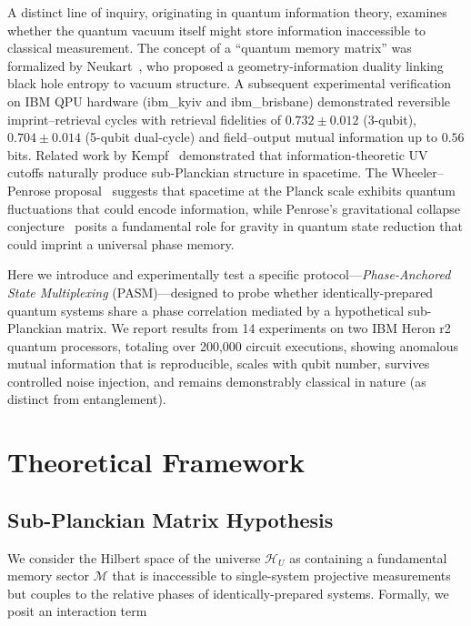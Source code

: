 ﻿\documentclass[12pt,a4paper]{article}
\begin{document}
A distinct line of inquiry, originating in quantum information theory, examines whether the quantum vacuum itself might store information inaccessible to classical measurement. The concept of a ``quantum memory matrix'' was formalized by Neukart~\cite{neukart2025}, who proposed a geometry-information duality linking black hole entropy to vacuum structure. A subsequent experimental verification~\cite{neukart2026qip} on IBM QPU hardware (ibm\_kyiv and ibm\_brisbane) demonstrated reversible imprint--retrieval cycles with retrieval fidelities of $0.732 \pm 0.012$ (3-qubit), $0.704 \pm 0.014$ (5-qubit dual-cycle) and field--output mutual information up to $0.56$ bits. Related work by Kempf~\cite{kempf2009} demonstrated that information-theoretic UV cutoffs naturally produce sub-Planckian structure in spacetime. The Wheeler--Penrose proposal~\cite{wheeler1957,penrose1996} suggests that spacetime at the Planck scale exhibits quantum fluctuations that could encode information, while Penrose's gravitational collapse conjecture~\cite{penrose1996} posits a fundamental role for gravity in quantum state reduction that could imprint a universal phase memory.

Here we introduce and experimentally test a specific protocol---\textit{Phase-Anchored State Multiplexing} (PASM)---designed to probe whether identically-prepared quantum systems share a phase correlation mediated by a hypothetical sub-Planckian matrix. We report results from 14 experiments on two IBM Heron r2 quantum processors, totaling over 200,000 circuit executions, showing anomalous mutual information that is reproducible, scales with qubit number, survives controlled noise injection, and remains demonstrably classical in nature (as distinct from entanglement).

\section{Theoretical Framework}
\label{sec:theory}

\subsection{Sub-Planckian Matrix Hypothesis}

We consider the Hilbert space of the universe $\mathcal{H}_U$ as containing a fundamental memory sector $\mathcal{M}$ that is inaccessible to single-system projective measurements but couples to the relative phases of identically-prepared systems. Formally, we posit an interaction term
\end{document}
